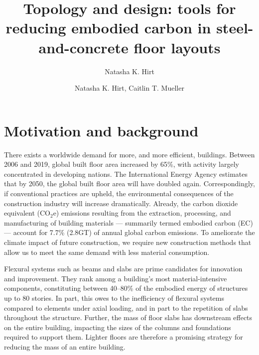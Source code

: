 \documentclass[10pt, letterpaper]{article} %
\author{Natasha K. Hirt}
\begin{document}
	
	\title{Topology and design: tools for reducing embodied carbon in steel-and-concrete floor layouts} %
	\author{Natasha K. Hirt, Caitlin T. Mueller} 
    \date{}      
	\maketitle                              %
	
	\section{Motivation and background}

    There exists a worldwide demand for more, and more efficient, buildings. Between 2006 and 2019, global built floor area increased by 65\%, with activity largely concentrated in developing nations. The International Energy Agency estimates that by 2050, the global built floor area will have doubled again.\cite{internationalenergyagencyGlobalBuildingsSector2022} Correspondingly, if conventional practices are upheld, the environmental consequences of the construction industry will increase dramatically. Already, the carbon dioxide equivalent (CO$_2$e) emissions resulting from the extraction, processing, and manufacturing of building materials --- summarily termed embodied carbon (EC) --- account for 7.7\% (2.8GT) of annual global carbon emissions.\cite{architecture2030WhyBuiltEnvironment} To ameliorate the climate impact of future construction, we require new construction methods that allow us to meet the same demand with less material consumption. 

    Flexural systems such as beams and slabs are prime candidates for innovation and improvement. They rank among a building's most material-intensive components, constituting between 40–80\% of the embodied energy of structures up to 80 stories.\cite{foraboschiSustainableStructuralDesign2014,bischofFosteringInnovativeSustainable2022,kromoserRessourceneffizientesBauenMit2020} In part, this owes to the inefficiency of flexural systems compared to elements under axial loading, and in part to the repetition of slabs throughout the structure. Further, the mass of floor slabs has downstream effects on the entire building, impacting the sizes of the columns and foundations required to support them. Lighter floors are therefore a promising strategy for reducing the mass of an entire building.
    
\end{document}
